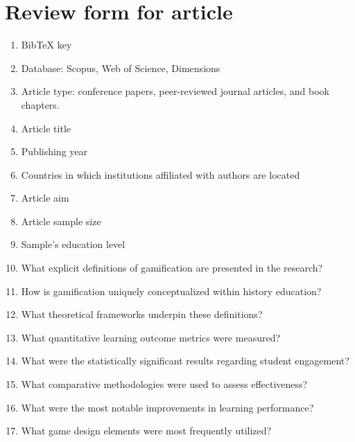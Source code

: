 \documentclass[a4paper,fleqn]{cas-sc}
\begin{document}
\section{Review form for article}
\label{reviewform}

\begin{enumerate}[noitemsep]
 \item 
BibTeX key

 \item 
Database: Scopus, Web of Science, Dimensions

 \item 
Article type: conference papers, peer-reviewed journal articles, and book chapters.

 \item 
Article title

 \item 
Publishing year 

 \item 
Countries in which institutions affiliated with authors are located
 
 \item 
Article aim

 \item 
Article sample size

 \item 
Sample’s education level 

 \item %
 What explicit definitions of gamification are presented in the research?

 \item %
How is gamification uniquely conceptualized within history education?

 \item %
What theoretical frameworks underpin these definitions?

 \item %
What quantitative learning outcome metrics were measured?

 \item %
What were the statistically significant results regarding student engagement?

 \item %
What comparative methodologies were used to assess effectiveness?

 \item %
What were the most notable improvements in learning performance?

 \item %
What game design elements were most frequently utilized?


\end{enumerate}
\end{document}
